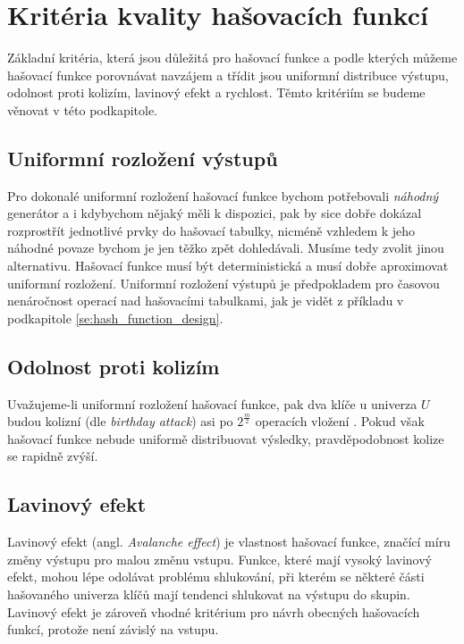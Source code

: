\section{Kritéria kvality hašovacích funkcí}

Základní kritéria, která jsou důležitá pro hašovací funkce a podle kterých můžeme hašovací funkce
porovnávat navzájem a třídit jsou uniformní distribuce výstupu, odolnost proti kolizím, lavinový efekt
a rychlost. Těmto kritériím se budeme věnovat v této podkapitole. 

\subsection{Uniformní rozložení výstupů}

Pro dokonalé uniformní rozložení hašovací funkce bychom potřebovali \textit{náhodný}
generátor a i kdybychom nějaký měli k dispozici, pak by sice dobře dokázal 
rozprostřít jednotlivé prvky do hašovací tabulky, nicméně vzhledem k jeho náhodné 
povaze bychom je jen těžko zpět dohledávali. Musíme tedy zvolit jinou 
alternativu. Hašovací funkce musí být deterministická a musí dobře aproximovat
uniformní rozložení. Uniformní rozložení výstupů je předpokladem pro časovou nenáročnost operací nad hašovacími tabulkami,
jak je vidět z příkladu v podkapitole \ref{se:hash_function_design}. 

\subsection{Odolnost proti kolizím}

Uvažujeme-li uniformní rozložení hašovací funkce, pak dva klíče u univerza
$U$ budou kolizní (dle \textit{birthday attack}) asi po $2^{\frac{m}{2}}$ 
operacích vložení \cite{NCHF_auto_design}. Pokud však hašovací funkce nebude
uniformě distribuovat výsledky, pravděpodobnost kolize se rapidně zvýší.

\subsection{Lavinový efekt}

Lavinový efekt (angl. \textit{Avalanche effect}) je vlastnost hašovací funkce, značící míru změny výstupu
pro malou změnu vstupu. 
Funkce, které mají vysoký lavinový efekt, mohou lépe odolávat problému shlukování,
při kterém se některé části hašovaného univerza klíčů mají tendenci shlukovat na výstupu
do skupin. Lavinový efekt je zároveň vhodné kritérium pro návrh obecných hašovacích funkcí,
protože není závislý na vstupu. 

